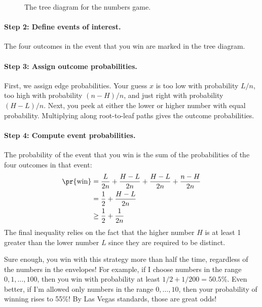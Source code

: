 \begin{figure}[h]


\caption{The tree diagram for the numbers game.}

\label{fig:16F4}

\end{figure}

\paragraph{Step 2: Define events of interest.}

The four outcomes in the event that you win are marked in the tree
diagram.

\paragraph{Step 3: Assign outcome probabilities.}

First, we assign edge probabilities.  Your guess $x$ is too low with
probability $L/n$, too high with probability $(n-H)/n$, and just right
with probability $(H-L)/n$.  Next, you peek at either the lower or
higher number with equal probability.  Multiplying along root-to-leaf
paths gives the outcome probabilities.

\paragraph{Step 4: Compute event probabilities.}

The probability of the event that you win is the sum of the
probabilities of the four outcomes in that event:
%
\begin{align*}
\pr{\text{win}}
    & = \frac{L}{2n} + \frac{H-L}{2n} + \frac{H-L}{2n}  + \frac{n-H}{2n} \\
    & = \frac{1}{2} + \frac{H-L}{2n} \\
    & \geq \frac{1}{2} + \frac{1}{2n}
\end{align*}
%
The final inequality relies on the fact that the higher number $H$ is
at least 1 greater than the lower number $L$ since they are required
to be distinct.

Sure enough, you win with this strategy more than half the time,
regardless of the numbers in the envelopes!  For example, if I choose
numbers in the range $0, 1, \dots, 100$, then you win with probability at
least $1/2 +1/200 = 50.5\%$.  Even better, if I'm allowed
only numbers in the range $0, \dots, 10$, then your probability of
winning rises to 55\%!  By Las Vegas standards, those are great odds!

